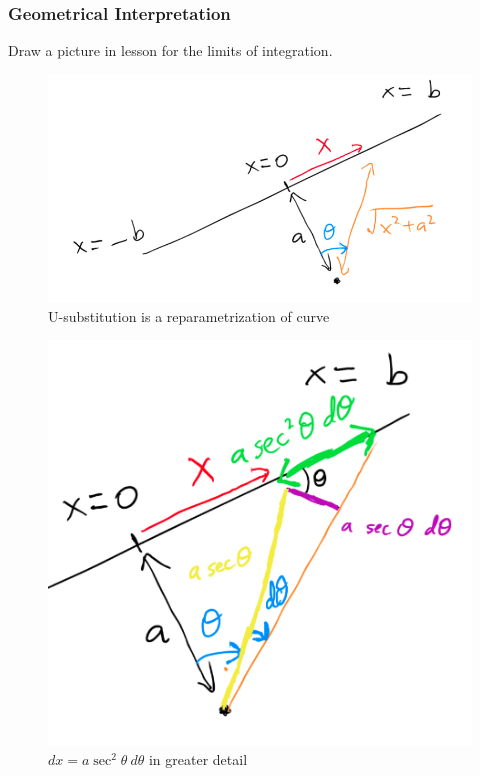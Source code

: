 \documentclass{article}
\begin{document}
\subsubsection{Geometrical Interpretation}
Draw a picture in lesson for the limits of integration.
\begin{figure}[h]
    \centering
    \includegraphics[width=0.5\linewidth]{images/usubgeom.png}
    \caption{U-substitution is a reparametrization of curve}
    \label{fig:usubgoem}
\end{figure}
\begin{figure}[h]
    \centering
    \includegraphics[width=0.5\linewidth]{images/usubgeom2.png}
    \caption{$dx=a \sec^2 \theta\ d\theta$ in greater detail}
    \label{fig:usubgeom2}
\end{figure}
\clearpage 
\end{document}
